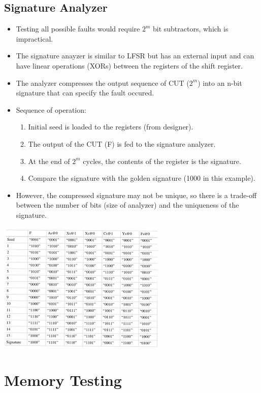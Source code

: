 \documentclass[11pt]{article}
\begin{document}
\subsection*{Signature Analyzer}
\begin{itemize}
    \item Testing all possible faults would require $2^{m}$ bit subtractors, which is impractical.
    \item The signature anayzer is similar to LFSR but has an external input and can have linear operations (XORs) between the registers of the shift register.
    \item The analyzer compresses the output sequence of CUT ($2^m$) into an n-bit signature that can specify the fault occured.
    \item Sequence of operation:
        \begin{enumerate}
            \item Initial seed is loaded to the registers (from designer).
            \item The output of the CUT (F) is fed to the signature analyzer.
            \item At the end of $2^m$ cycles, the contents of the register is the signature.
            \item Compare the signature with the golden signature (1000 in this example).
        \end{enumerate}
    \item However, the compressed signature may not be unique, so there is a trade-off between the number of bits (size of analyzer) and the uniqueness of the signature.
\end{itemize}
\begin{center}
    \includegraphics[width=0.6\textwidth]{9.png}
\end{center}

\section*{Memory Testing}
\end{document}
